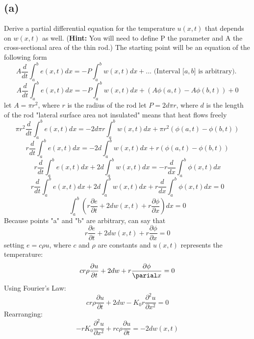 \documentclass[preview,12pt]{article}
\begin{document}
    \subsection*{(a)}
        Derive a partial differential equation for the temperature $u(x,t)$ that depends on $w(x,t)$ as well.  (\textbf{Hint: }You will need to define P the parameter and A the cross-sectional area of the thin rod.)  \newline The starting point will be an equation of the following form
        $$A\frac{d}{dt}\int_a^be(x,t)dx=-P\int_a^bw(x,t)dx+... \textrm{ (Interval [$a,b$] is arbitrary). }$$
        $$A\frac{d}{dt}\int_a^be(x,t)dx=-P\int_a^bw(x,t)dx+(A\phi(a,t)-A\phi(b,t))+0$$
        let $A=\pi r^2$, where $r$ is the radius of the rod \newline
        let $P=2d\pi r$, where $d$ is the length of the rod \newline
        "lateral surface area not insulated" means that heat flows freely \newline
        $$\pi r^2\frac{d}{dt}\int_a^be(x,t)dx=-2d\pi r \int_a^bw(x,t)dx+\pi r^2(\phi(a,t)-\phi(b,t))$$
        $$r\frac{d}{dt}\int_a^be(x,t)dx=-2d\int_a^bw(x,t)dx+ r(\phi(a,t)-\phi(b,t))$$
        $$r\frac{d}{dt}\int_a^be(x,t)dx+2d\int_a^bw(x,t)dx=-r\frac{d}{dx}\int_a^b \phi (x,t) dx$$
        $$r\frac{d}{dt}\int_a^be(x,t)dx+2d\int_a^bw(x,t)dx+r\frac{d}{dx}\int_a^b \phi (x,t) dx=0$$
        $$\int_a^b \left( r\frac{\partial e}{\partial t}+2dw(x,t)+r\frac{\partial \phi}{\partial x} \right) dx = 0$$
        Because points "a" and "b" are arbitrary, can say that
        $$r\frac{\partial e}{\partial t}+2dw(x,t)+r\frac{\partial \phi}{\partial x}=0$$
        setting $e=c\rho u$, where $c$ and $\rho$ are constants and $u(x,t)$ represents the temperature:
        $$cr\rho \frac{\partial u}{\partial t}+2dw+r\frac{\partial \phi}{\parial x}=0$$ 
        Using Fourier's Law:
        $$cr\rho \frac{\partial u}{\partial t}+2dw-K_0r\frac{\partial^2u}{\partial x^2}=0$$
        Rearranging:
        $$\boxed{-rK_0\frac{\partial^2u}{\partial x^2}+rc\rho \frac{\partial u}{\partial t}=-2dw(x,t)}$$
\end{document}
